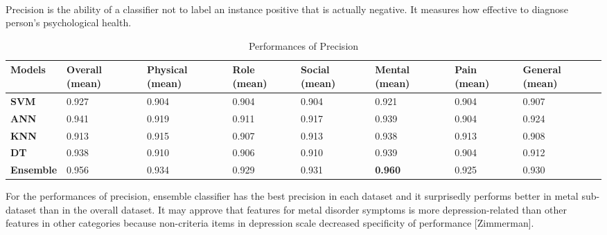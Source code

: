 \documentclass[runningheads]{llncs}
\begin{document}
\paragraph{}
Precision is the ability of a classifier not to label an instance positive that is actually negative. It measures how effective to diagnose person's psychological health.
\begin{table}[h]
\begin{tabular}{|C{2cm}|C{1.5cm}|C{1.5cm}|C{1.5cm}|C{1.5cm}|C{1.5cm}|C{1.5cm}|C{1.5cm}|}
\hline
{} 
{\color[HTML]{333333} \textbf{Models}} & {\color[HTML]{333333} \textbf{Overall (mean)}} & {\color[HTML]{333333} \textbf{Physical (mean)}} & {\color[HTML]{333333} \textbf{Role (mean)}} &{\color[HTML]{333333} \textbf{Social (mean)}} & {\color[HTML]{333333} \textbf{Mental (mean)}} & {\color[HTML]{333333} \textbf{Pain (mean)}} & {\color[HTML]{333333} \textbf{General (mean)}} \\ \hline
{} 
\textbf{SVM} & 0.927 & 0.904 & 0.904  & 0.904  & 0.921  & 0.904  & 0.907  \\ \hline
{} 
\textbf{ANN}   & 0.941   & 0.919   & 0.911  & 0.917   & 0.939 & 0.904 & 0.924 \\ \hline
{} 
\textbf{KNN} & 0.913 & 0.915 & 0.907  & 0.913 & 0.938 & 0.913  & 0.908  \\ \hline
{} 
\textbf{DT} & 0.938  & 0.910  & 0.906   & 0.910  & 0.939 & 0.904  & 0.912   \\ \hline
{} 
\textbf{Ensemble} & 0.956  & 0.934  & 0.929 & 0.931  & \textbf{0.960}  & 0.925 & 0.930 \\ \hline
\end{tabular}
\caption{Performances of Precision}
\label{Precision}
\end{table}
%
%
For the performances of precision, ensemble classifier has the best precision in each dataset and it surprisedly performs better in metal sub-dataset than in the overall dataset. It may approve that features for metal disorder symptoms is more depression-related than other features in other categories because non-criteria items in depression scale decreased specificity of performance [Zimmerman].
%
%
%
\end{document}
